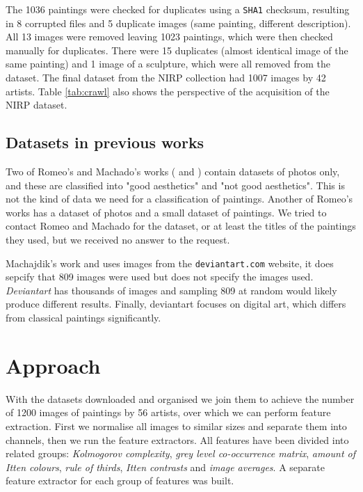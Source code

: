 \documentclass[11pt,a4paper,twoside,openright]{report}
\begin{document}
The 1036 paintings were checked for duplicates using a \texttt{SHA1} checksum,
resulting in 8 corrupted files and 5 duplicate images (same painting, different
description).  All 13 images were removed leaving 1023 paintings, which were
then checked manually for duplicates.  There were 15 duplicates (almost
identical image of the same painting) and 1 image of a sculpture, which were
all removed from the dataset.  The final dataset from the NIRP collection had
1007 images by 42 artists.  Table \ref{tab:crawl} also shows the perspective of
the acquisition of the NIRP dataset.

\section{Datasets in previous works}

Two of Romeo's and Machado's works (\cite{jma12clas} and \cite{cmrc13fs})
contain datasets of photos only, and these are classified into "good
aesthetics" and "not good aesthetics".  This is not the kind of data we need
for a classification of paintings.  Another of Romeo's works \cite{rmc12ajs}
has a dataset of photos and a small dataset of paintings.  We tried to contact
Romeo and Machado for the dataset, or at least the titles of the paintings they
used, but we received no answer to the request.

Machajdik's work \cite{mach10clas} and \cite{mach10ua} uses images from the
\texttt{deviantart.com} website, it does sepcify that 809 images were used but
does not specify the images used.  \emph{Deviantart} has thousands of images
and sampling 809 at random would likely produce different results.  Finally,
deviantart focuses on digital art, which differs from classical paintings
significantly.


\chapter{Approach}  %
\label{chap:approach}

With the datasets downloaded and organised we join them to achieve the number
of 1200 images of paintings by 56 artists, over which we can perform feature
extraction.  First we normalise all images to similar sizes and separate them
into channels, then we run the feature extractors.  All features have been
divided into related groups: \emph{Kolmogorov complexity}, \emph{grey level
co-occurrence matrix}, \emph{amount of Itten colours}, \emph{rule of thirds},
\emph{Itten contrasts} and \emph{image averages}.  A separate feature extractor
for each group of features was built.
\end{document}
